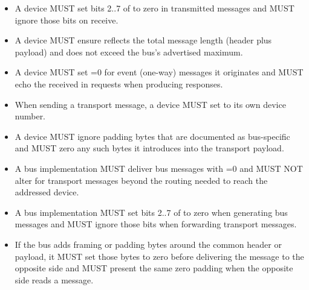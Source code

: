 \begin{itemize}
  \item A device MUST set bits 2..7 of  to zero in transmitted messages and MUST ignore
        those bits on receive.
  \item A device MUST ensure  reflects the total message length (header plus payload)
        and does not exceed the bus's advertised maximum.
  \item A device MUST set =0 for event (one-way) messages it originates and MUST echo
        the  received in requests when producing responses.
  \item When sending a transport message, a device MUST set  to its own device number.
  \item A device MUST ignore padding bytes that are documented as bus-specific and MUST zero any such
        bytes it introduces into the transport payload.
\end{itemize}

\begin{itemize}
  \item A bus implementation MUST deliver bus messages with =0 and MUST NOT alter
         for transport messages beyond the routing needed to reach the addressed
        device.
  \item A bus implementation MUST set bits 2..7 of  to zero when generating bus messages
        and MUST ignore those bits when forwarding transport messages.
  \item If the bus adds framing or padding bytes around the common header or payload, it MUST set
        those bytes to zero before delivering the message to the opposite side and MUST present the
        same zero padding when the opposite side reads a message.
\end{itemize}

